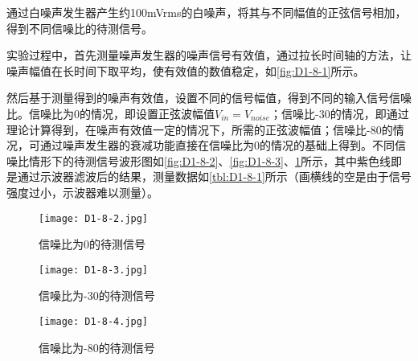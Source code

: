 \documentclass[dvipsnames, svgnames,a4paper,11pt]{article}
\begin{document}
	通过白噪声发生器产生约100mVrms的白噪声，将其与不同幅值的正弦信号相加，得到不同信噪比的待测信号。
	
	实验过程中，首先测量噪声发生器的噪声信号有效值，通过拉长时间轴的方法，让噪声幅值在长时间下取平均，使有效值的数值稳定，如\cref{fig:D1-8-1}所示。

	然后基于测量得到的噪声有效值，设置不同的信号幅值，得到不同的输入信号信噪比。信噪比为0的情况，即设置正弦波幅值$V_{in} = V_{noise}$；信噪比-30的情况，即通过理论计算得到，在噪声有效值一定的情况下，所需的正弦波幅值；信噪比-80的情况，可通过噪声发生器的衰减功能直接在信噪比为0的情况的基础上得到。不同信噪比情形下的待测信号波形图如\cref{fig:D1-8-2}、\cref{fig:D1-8-3}、\cref{fig:D1-8-4}所示，其中紫色线即是通过示波器滤波后的结果，测量数据如\cref{tbl:D1-8-1}所示（画横线的空是由于信号强度过小，示波器难以测量）。








	\begin{figure}[htbp]
		\centering
		\begin{minipage}{0.4\textwidth}
			\centering
			\texttt{[image: D1-8-2.jpg]}
			\caption{信噪比为0的待测信号}
			\label{fig:D1-8-2}
		\end{minipage}
		\begin{minipage}{0.4\textwidth}
			\centering
			\texttt{[image: D1-8-3.jpg]}
			\caption{信噪比为-30的待测信号}
			\label{fig:D1-8-3}
		\end{minipage}
		
		\begin{minipage}{0.4\textwidth}
			\centering
			\texttt{[image: D1-8-4.jpg]}
			\caption{信噪比为-80的待测信号}
			\label{fig:D1-8-4}
		\end{minipage}
	\end{figure}
	
\end{document}
